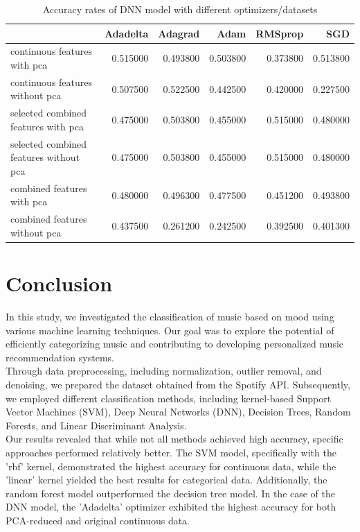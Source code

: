 \documentclass{article}
\begin{document}
\begin{table}
\caption{Accuracy rates of DNN model with different optimizers/datasets}
\centering
\begin{tabular}{lrrrrr}
\hline
\toprule
 & Adadelta & Adagrad & Adam & RMSprop & SGD \\
\midrule
\hline
continuous features with pca & 0.515000 & 0.493800 & 0.503800 & 0.373800 & 0.513800 \\
continuous features without pca & 0.507500 & 0.522500 & 0.442500 & 0.420000 & 0.227500 \\
selected combined features with pca & 0.475000 & 0.503800 & 0.455000 & 0.515000 & 0.480000 \\
selected combined features without pca & 0.475000 & 0.503800 & 0.455000 & 0.515000 & 0.480000 \\
combined features with pca & 0.480000 & 0.496300 & 0.477500 & 0.451200 & 0.493800 \\
combined features without pca & 0.437500 & 0.261200 & 0.242500 & 0.392500 & 0.401300 \\
\bottomrule
\hline
\end{tabular}
\end{table}

\section{Conclusion}
In this study, we investigated the classification of music based on mood using various machine learning techniques. Our goal was to explore the potential of efficiently categorizing music and contributing to developing personalized music recommendation systems. \\

Through data preprocessing, including normalization, outlier removal, and denoising, we prepared the dataset obtained from the Spotify API. Subsequently, we employed different classification methods, including kernel-based Support Vector Machines (SVM), Deep Neural Networks (DNN), Decision Trees, Random Forests, and Linear Discriminant Analysis. \\

Our results revealed that while not all methods achieved high accuracy, specific approaches performed relatively better. The SVM model, specifically with the 'rbf' kernel, demonstrated the highest accuracy for continuous data, while the 'linear' kernel yielded the best results for categorical data.
Additionally, the random forest model outperformed the decision tree model. In the case of the DNN model, the 'Adadelta' optimizer exhibited the highest accuracy for both PCA-reduced and original continuous data.\\
\end{document}
